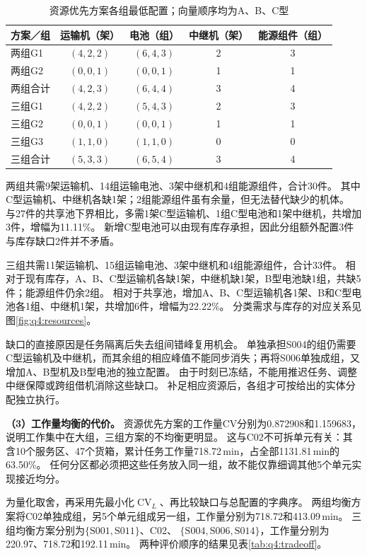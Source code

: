 \begin{table}[htbp]
  \centering
  \caption{资源优先方案各组最低配置；向量顺序均为A、B、C型}
  \label{tab:q4:group-resources}
  \begin{tabular}{lcccc}
    \toprule
    方案／组 & 运输机（架） & 电池（组） & 中继机（架） & 能源组件（组） \\
    \midrule
    两组G1 & $(4,2,2)$ & $(6,4,3)$ & 2 & 3 \\
    两组G2 & $(0,0,1)$ & $(0,0,1)$ & 1 & 1 \\
    两组合计 & $(4,2,3)$ & $(6,4,4)$ & 3 & 4 \\
    \midrule
    三组G1 & $(4,2,2)$ & $(5,4,3)$ & 2 & 3 \\
    三组G2 & $(0,0,1)$ & $(0,0,1)$ & 1 & 1 \\
    三组G3 & $(1,1,0)$ & $(1,1,0)$ & 0 & 0 \\
    三组合计 & $(5,3,3)$ & $(6,5,4)$ & 3 & 4 \\
    \bottomrule
  \end{tabular}
\end{table}

两组共需9架运输机、14组运输电池、3架中继机和4组能源组件，合计30件。
其中C型运输机、中继机各缺1架；2组能源组件虽有余量，但无法替代缺少的机体。
与27件的共享池下界相比，多需1架C型运输机、1组C型电池和1架中继机，共增加3件，增幅为11.11\%。
新增C型电池可以由现有库存承担，因此分组额外配置3件与库存缺口2件并不矛盾。

三组共需11架运输机、15组运输电池、3架中继机和4组能源组件，合计33件。
相对于现有库存，A、B、C型运输机各缺1架，中继机缺1架，B型电池缺1组，共缺5件；能源组件仍余2组。
相对于共享池，增加A、B、C型运输机各1架、B和C型电池各1组、中继机1架，共增加6件，增幅为22.22\%。
分类需求与库存的对应关系见图\ref{fig:q4:resources}。

缺口的直接原因是任务隔离后失去组间错峰复用机会。
单独承担S004的组仍需要C型运输机及中继机，而其余组的相应峰值不能同步消失；再将S006单独成组，又增加A、B型机及B型电池的独立配置。
由于时刻已冻结，不能用推迟任务、调整中继保障或跨组借机消除这些缺口。
补足相应资源后，各组才可按给出的实体分配独立执行。

\textbf{（3）工作量均衡的代价。}
资源优先方案的工作量CV分别为0.872908和1.159683，说明工作集中在大组，三组方案的不均衡更明显。
这与C02不可拆单元有关：其含10个服务区、47个货箱，累计任务工作量718.72\,min，占全部1131.81\,min的63.50\%。
任何分区都必须把这些任务放入同一组，故不能仅靠细调其他5个单元实现接近均分。

为量化取舍，再采用先最小化$\operatorname{CV}_L$、再比较缺口与总配置的字典序。
两组均衡方案将C02单独成组，另5个单元组成另一组，工作量分别为718.72和413.09\,min。
三组均衡方案分别为$\{\mathrm{S001},\mathrm{S011}\}$、C02、
$\{\mathrm{S004},\mathrm{S006},\mathrm{S014}\}$，工作量分别为220.97、718.72和192.11\,min。
两种评价顺序的结果见表\ref{tab:q4:tradeoff}。

